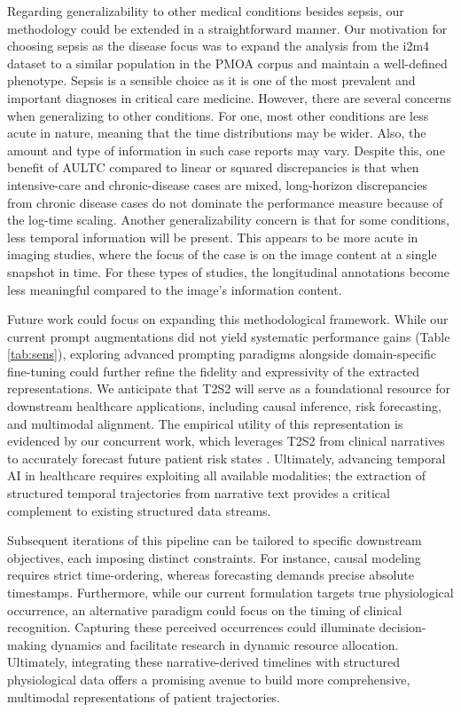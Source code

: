 \documentclass[pmlr,twocolumn,10pt]{jmlr} %
\begin{document}
Regarding generalizability to other medical conditions besides sepsis, our methodology could be extended in a straightforward manner. Our motivation for choosing sepsis as the disease focus was to expand the analysis from the i2m4 dataset to a similar population in the PMOA corpus and maintain a well-defined phenotype. Sepsis is a sensible choice as it is one of the most prevalent and important diagnoses in critical care medicine.  
However, there are several concerns when generalizing to other conditions. For one, most other conditions are less acute in nature, meaning that the time distributions may be wider. Also, the amount and type of information in such case reports may vary. 
Despite this, one benefit of AULTC compared to linear or squared discrepancies is that when intensive-care and chronic-disease cases are mixed, long-horizon discrepancies from chronic disease cases do not dominate the performance measure because of the log-time scaling.
Another generalizability concern is that for some conditions, less temporal information will be present. This appears to be more acute in imaging studies, where the focus of the case is on the image content at a single snapshot in time. For these types of studies, the longitudinal annotations become less meaningful compared to the image's information content.

Future work could focus on expanding this methodological framework. While our current prompt augmentations did not yield systematic performance gains (Table \ref{tab:sens}), exploring advanced prompting paradigms alongside domain-specific fine-tuning could further refine the fidelity and expressivity of the extracted representations. We anticipate that T2S2 will serve as a foundational resource for downstream healthcare applications, including causal inference, risk forecasting, and multimodal alignment. The empirical utility of this representation is evidenced by our concurrent work, which leverages T2S2 from clinical narratives to accurately forecast future patient risk states \citep{noroozizadeh2026forecasting}. Ultimately, advancing temporal AI in healthcare requires exploiting all available modalities; the extraction of structured temporal trajectories from narrative text provides a critical complement to existing structured data streams.

Subsequent iterations of this pipeline can be tailored to specific downstream objectives, each imposing distinct constraints. For instance, causal modeling requires strict time-ordering, whereas forecasting demands precise absolute timestamps. Furthermore, while our current formulation targets true physiological occurrence, an alternative paradigm could focus on the timing of clinical recognition. Capturing these perceived occurrences could illuminate decision-making dynamics and facilitate research in dynamic resource allocation. 
Ultimately, integrating these narrative-derived timelines with structured physiological data offers a promising avenue to build more comprehensive, multimodal representations of patient trajectories.
\end{document}
